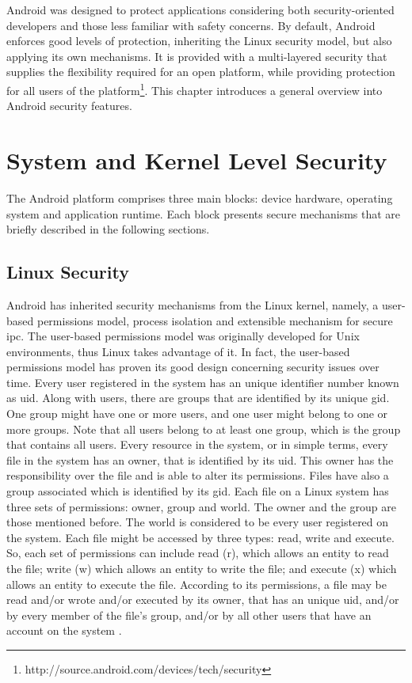 Android was designed to protect applications considering both security-oriented developers and those less familiar with safety concerns. By default, Android enforces good levels of protection, inheriting the Linux security model, but also applying its own mechanisms. It is provided with a multi-layered security that supplies the flexibility required for an open platform, while providing protection for all users of the platform\footnote{http://source.android.com/devices/tech/security}. This chapter introduces a general overview into Android security features.

\section{System and Kernel Level Security}

The Android platform comprises three main blocks: device hardware, operating system and application runtime. Each block presents secure mechanisms that are briefly described in the following sections. 

\subsection{Linux Security}

Android has inherited security mechanisms from the Linux kernel, namely, a user-based permissions model, process isolation and extensible mechanism for secure \gls{ipc}. The user-based permissions model was originally developed for Unix environments, thus Linux takes advantage of it. In fact, the user-based permissions model has proven its good design concerning security issues over time. Every user registered in the system has an unique identifier number known as \gls{uid}. Along with users, there are groups that are identified by its unique \gls{gid}. One group might have one or more users, and one user might belong to one or more groups. Note that all users belong to at least one group, which is the group that contains all users. Every resource in the system, or in simple terms, every file in the system has an owner, that is identified by its \gls{uid}. This owner has the responsibility over the file and is able to alter its permissions. Files have also a group associated which is identified by its \gls{gid}. Each file on a Linux system has three sets of permissions: owner, group and world. The owner and the group are those mentioned before. The world is considered to be every user registered on the system. Each file might be accessed by three types: read, write and execute. So, each set of permissions can include read (r), which allows an entity to read the file; write (w) which allows an entity to write the file; and execute (x) which allows an entity to execute the file. According to its permissions, a file may be read and/or wrote and/or executed by its owner, that has an unique \gls{uid}, and/or by every member of the file's group, and/or by all other users that have an account on the system \cite{ComputerSecurity}.

